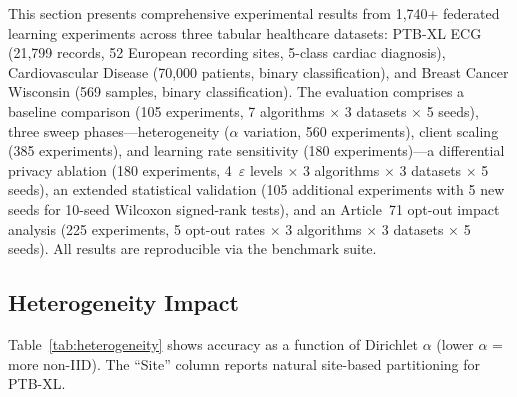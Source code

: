 \documentclass[conference,a4paper]{IEEEtran}
\begin{document}
This section presents comprehensive experimental results from 1,740+ federated learning experiments across three tabular healthcare datasets: PTB-XL ECG (21,799 records, 52 European recording sites, 5-class cardiac diagnosis), Cardiovascular Disease (70,000 patients, binary classification), and Breast Cancer Wisconsin (569 samples, binary classification). The evaluation comprises a baseline comparison (105 experiments, 7 algorithms $\times$ 3 datasets $\times$ 5 seeds), three sweep phases---heterogeneity ($\alpha$ variation, 560 experiments), client scaling (385 experiments), and learning rate sensitivity (180 experiments)---a differential privacy ablation (180 experiments, 4~$\varepsilon$ levels $\times$ 3 algorithms $\times$ 3 datasets $\times$ 5 seeds), an extended statistical validation (105 additional experiments with 5 new seeds for 10-seed Wilcoxon signed-rank tests), and an Article~71 opt-out impact analysis (225 experiments, 5 opt-out rates $\times$ 3 algorithms $\times$ 3 datasets $\times$ 5 seeds). All results are reproducible via the benchmark suite.

\subsection{Heterogeneity Impact}

Table~\ref{tab:heterogeneity} shows accuracy as a function of Dirichlet $\alpha$ (lower $\alpha$ = more non-IID). The ``Site'' column reports natural site-based partitioning for PTB-XL.
\end{document}
